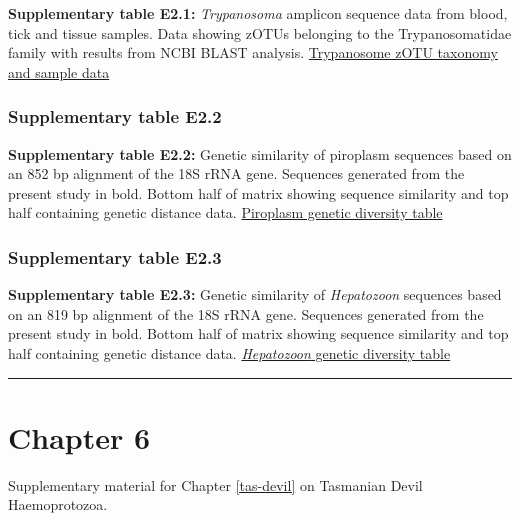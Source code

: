 \documentclass[a4paper, nobind]{templates/ociamthesis}
\begin{document}
\textbf{Supplementary table E2.1:} \emph{Trypanosoma} amplicon sequence data from blood, tick and tissue samples. Data showing zOTUs belonging to the Trypanosomatidae family with results from NCBI BLAST analysis. \href{https://figshare.com/ndownloader/files/30578460}{Trypanosome zOTU taxonomy and sample data}

\hypertarget{supplementary-table-e2.2}{%
\subsubsection{Supplementary table E2.2}\label{supplementary-table-e2.2}}

\textbf{Supplementary table E2.2:} Genetic similarity of piroplasm sequences based on an 852 bp alignment of the 18S rRNA gene. Sequences generated from the present study in bold. Bottom half of matrix showing sequence similarity and top half containing genetic distance data.
\href{https://figshare.com/ndownloader/files/30578457}{Piroplasm genetic diversity table}

\hypertarget{supplementary-table-e2.3}{%
\subsubsection{Supplementary table E2.3}\label{supplementary-table-e2.3}}

\textbf{Supplementary table E2.3:} Genetic similarity of \emph{Hepatozoon} sequences based on an 819 bp alignment of the 18S rRNA gene. Sequences generated from the present study in bold. Bottom half of matrix showing sequence similarity and top half containing genetic distance data.
\href{https://figshare.com/ndownloader/files/30578463}{\emph{Hepatozoon} genetic diversity table}

\begin{center}\rule{0.5\linewidth}{0.5pt}\end{center}

\clearpage

\hypertarget{ch6-supp}{%
\section{Chapter 6}\label{ch6-supp}}

Supplementary material for Chapter \ref{tas-devil} on Tasmanian Devil Haemoprotozoa.
\end{document}
